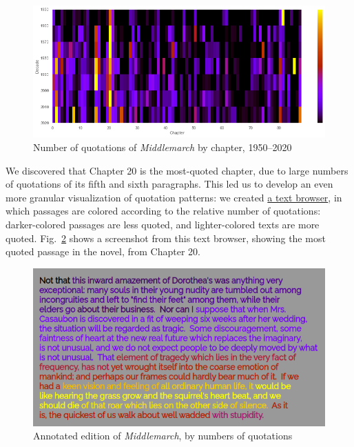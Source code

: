 \documentclass[
]{article}
\begin{document}
\begin{figure}
\hypertarget{fig:byChapterDiachronic}{%
\centering
\includegraphics{byChapterDiachronic.png}
\caption{Number of quotations of \emph{Middlemarch} by chapter,
1950--2020}\label{fig:byChapterDiachronic}
}
\end{figure}

We discovered that Chapter 20 is the most-quoted chapter, due to large
numbers of quotations of its fifth and sixth paragraphs. This led us to
develop an even more granular visualization of quotation patterns: we
created
\href{https://lit-mod-viz.github.io/middlemarch-critical-histories/annotated.html}{a
text browser}, in which passages are colored according to the relative
number of quotations: darker-colored passages are less quoted, and
lighter-colored texts are more quoted. Fig.~\ref{fig:annotated} shows a
screenshot from this text browser, showing the most quoted passage in
the novel, from Chapter 20.

\begin{figure}
\hypertarget{fig:annotated}{%
\centering
\includegraphics{annotated.png}
\caption{Annotated edition of \emph{Middlemarch}, by numbers of
quotations}\label{fig:annotated}
}
\end{figure}
\end{document}
